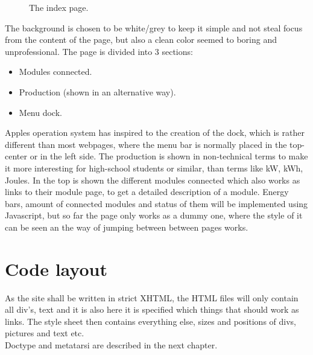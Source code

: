 \begin{figure}[h!]
	\center
		\setlength\fboxsep{0pt}
		\setlength\fboxrule{1pt}
   	\caption{The index page.}
   	\label{fig:index_page_design}
\end{figure}
The background is chosen to be white/grey to keep it simple and not steal focus from the content of the page, but also a clean color seemed to boring and unprofessional. 
\newpage The page is divided into 3 sections:
\begin{itemize}
	\item Modules connected.
	\item Production (shown in an alternative way).
	\item Menu dock.
\end{itemize}
Apples operation system has inspired to the creation of the dock, which is rather different than most webpages, where the menu bar is normally placed in the top-center or in the left side. The production is shown in non-technical terms to make it more interesting for high-school students or similar, than terms like kW, kWh, Joules. In the top is shown the different modules connected which also works as links to their module page, to get a detailed description of a module. Energy bars, amount of connected modules and status of them will be implemented using Javascript, but so far the page only works as a dummy one, where the style of it can be seen an the way of jumping between between pages works.  
\section{Code layout}
As the site shall be written in strict XHTML, the HTML files will only contain all div's, text and it is also here it is specified which things that should work as links. The style sheet then contains everything else, sizes and positions of divs, pictures and text etc.
\\Doctype and metatarsi are described in the next chapter.
